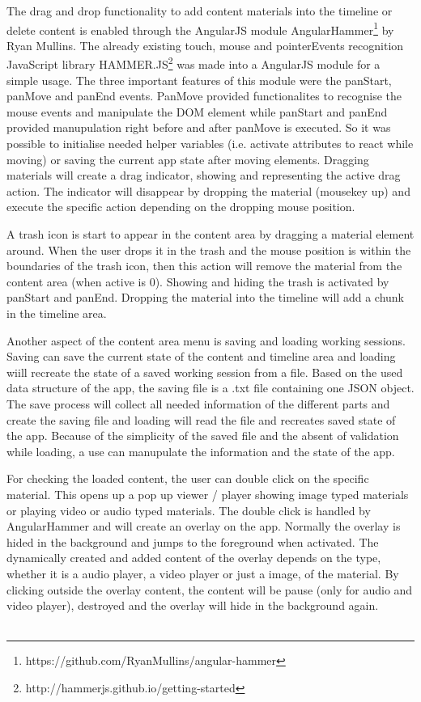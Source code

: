 \documentclass[conference]{IEEEtran}
\begin{document}
The drag and drop functionality to add content materials into the timeline or delete content is enabled through the AngularJS module AngularHammer\footnote{https://github.com/RyanMullins/angular-hammer} by Ryan Mullins. The already existing touch, mouse and pointerEvents recognition JavaScript library HAMMER.JS\footnote{http://hammerjs.github.io/getting-started} was made into a AngularJS module for a simple usage. The three important features of this module were the panStart, panMove and panEnd events. PanMove provided functionalites to recognise the mouse events and manipulate the DOM element while panStart and panEnd provided manupulation right before and after panMove is executed. So it was possible to initialise needed helper variables (i.e. activate attributes to react while moving) or saving the current app state after moving elements. Dragging materials will create a drag indicator, showing and representing the active drag action. The indicator will disappear by dropping the material (mousekey up) and execute the specific action depending on the dropping mouse position.

A trash icon is start to appear in the content area by dragging a material element around. When the user drops it in the trash and the mouse position is within the boundaries of the trash icon, then this action will remove the material from the content area (when active is 0). Showing and hiding the trash is activated by panStart and panEnd. Dropping the material into the timeline will add a chunk in the timeline area.

Another aspect of the content area menu is saving and loading working sessions. Saving can save the current state of the content and timeline area and loading wiill recreate the state of a saved working session from a file. Based on the used data structure of the app, the saving file is a .txt file containing one JSON object. The save process will collect all needed information of the different parts and create the saving file and loading will read the file and recreates saved state of the app. Because of the simplicity of the saved file and the absent of validation while loading, a use can manupulate the information and the state of the app.

For checking the loaded content, the user can double click on the specific material. This opens up a pop up viewer / player showing image typed materials or playing video or audio typed materials. The double click is handled by AngularHammer and will create an overlay on the app. Normally the overlay is hided in the background and jumps to the foreground when activated. The dynamically created and added content of the overlay depends on the type, whether it is a audio player, a video player or just a image, of the material. By clicking outside the overlay content, the content will be pause (only for audio and video player), destroyed and the overlay will hide in the background again.\\
\\
\end{document}
